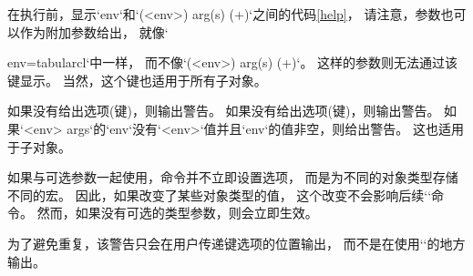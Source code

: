   在执行前，显示`env`和`(<env>) arg(s) (+)`之间的代码\cref{help}，
  请注意，参数也可以作为附加参数给出，
  就像`\begin{tableobject}{env=tabular}{cl}`中一样，
  而不像`(<env>) arg(s) (+)`。
  这样的参数则无法通过该键显示。
  当然，这个键也适用于所有子对象。

如果没有给出选项(键)，则输出警告。
  如果没有给出选项(键)，则输出警告。
  如果`<env> args`的`env`没有`<env>`值并且`env`的值非空，则给出警告。
  这也适用于子对象。

  如果与可选参数一起使用，\cmd{\objectset}命令并不立即设置选项，
  而是为不同的对象类型存储不同的宏。
  因此，如果改变了某些对象类型的值，
  这个改变不会影响后续`\objectset`命令。
  然而，如果没有可选的类型参数，则会立即生效。

  为了避免重复，该警告只会在用户传递键选项的位置输出，
  而不是在使用``的地方输出。


\end{tableobject}
